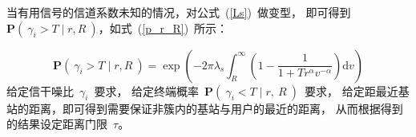 当有用信号的信道系数未知的情况，对公式~(\ref{Ls})~做变型，
即可得到~$\mathbf{P}(~\gamma_i > T \mid r,R~)$，如式~(\ref{p_r_R})~所示：

\begin{equation}\label{p_r_R}
  \mathbf{P}(~\gamma_i > T \mid r,R~)
  {=}  \exp\left(-2\pi\lambda_s\int_{R}^{\infty}
          \left(1 - \frac{1}{1+ T r ^\alpha v^{-\alpha}}\right)\mathrm{d}v\right)
\end{equation}
给定信干噪比~$\gamma_i$~要求，
给定终端概率~$\mathbf{P}(~\gamma_i < T \mid r,~R~)$~要求，
给定距最近基站的距离，即可得到需要保证非簇内的基站与用户的最近的距离，
从而根据得到的结果设定距离门限~$\tau$。





